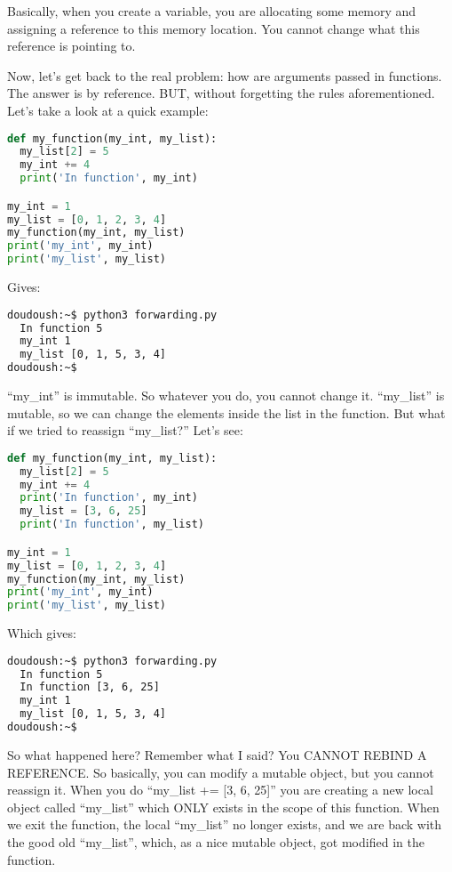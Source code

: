 Basically, when you create a variable, you are allocating some memory and assigning a reference
to this memory location. You cannot change what this reference is pointing to.

\vspace{5mm}
Now, let's get back to the real problem: how are arguments passed in functions. The answer is by reference.
BUT, without forgetting the rules aforementioned. Let's take a look at a quick example:

\begin{lstlisting}[language=python]
def my_function(my_int, my_list):
  my_list[2] = 5
  my_int += 4
  print('In function', my_int)

my_int = 1
my_list = [0, 1, 2, 3, 4]
my_function(my_int, my_list)
print('my_int', my_int)
print('my_list', my_list)
\end{lstlisting}

Gives:

\begin{lstlisting}[language=bash]
doudoush:~$ python3 forwarding.py
  In function 5
  my_int 1
  my_list [0, 1, 5, 3, 4]
doudoush:~$
\end{lstlisting}

``my\_int'' is immutable. So whatever you do, you cannot change it. ``my\_list'' is mutable,
so we can change the elements inside the list in the function. But what if we tried to
reassign ``my\_list?'' Let's see:

\begin{lstlisting}[language=python]
def my_function(my_int, my_list):
  my_list[2] = 5
  my_int += 4
  print('In function', my_int)
  my_list = [3, 6, 25]
  print('In function', my_list)

my_int = 1
my_list = [0, 1, 2, 3, 4]
my_function(my_int, my_list)
print('my_int', my_int)
print('my_list', my_list)
\end{lstlisting}

Which gives:

\begin{lstlisting}[language=bash]
doudoush:~$ python3 forwarding.py
  In function 5
  In function [3, 6, 25]
  my_int 1
  my_list [0, 1, 5, 3, 4]
doudoush:~$
\end{lstlisting}

So what happened here? Remember what I said? You CANNOT REBIND A REFERENCE.
So basically, you can modify a mutable object, but you cannot reassign it.
When you do ``my\_list += [3, 6, 25]'' you are creating a new local object called ``my\_list''
which ONLY exists in the scope of this function. When we exit the function, the local ``my\_list''
no longer exists, and we are back with the good old ``my\_list'', which, as a nice mutable
object, got modified in the function.

